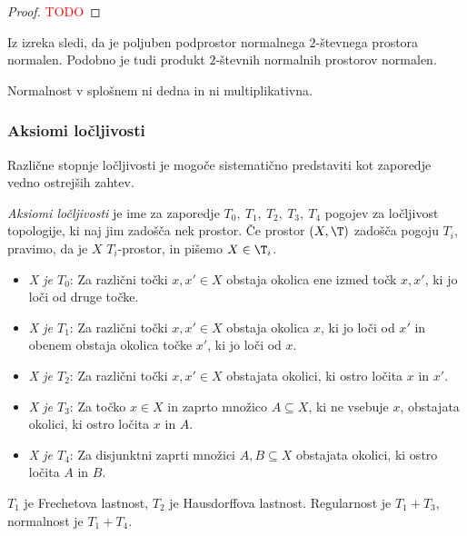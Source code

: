 \begin{proof}
    \textcolor{red}{TODO}
\end{proof}

\begin{opomba}
    Iz izreka sledi, da je poljuben podprostor normalnega $2$-števnega prostora normalen. Podobno je tudi produkt $2$-števnih normalnih prostorov normalen.
\end{opomba}

\begin{opomba}
    Normalnost v splošnem ni dedna in ni multiplikativna.
\end{opomba}

\subsubsection{Aksiomi ločljivosti}
Različne stopnje ločljivosti je mogoče sistematično predstaviti kot zaporedje vedno ostrejših zahtev.

\begin{definicija}
    \emph{Aksiomi ločljivosti} je ime za zaporedje $T_0, \ T_1, \  T_2,\ T_3,\ T_4$ pogojev za ločljivost topologije, ki naj jim zadošča nek prostor. Če prostor $(X, \T)$ zadošča pogoju $T_i$, pravimo, da je $X$ $T_i$-prostor, in pišemo $X \in \T_i$.
\end{definicija}


\begin{itemize}
    \item [] \emph{X je $T_0$}: Za različni točki $x, x' \in X$ obstaja okolica ene izmed točk $x, x'$, ki jo loči od druge točke.
    \item [] \emph{X je $T_1$}: Za različni točki $x, x' \in X$ obstaja okolica $x$, ki jo loči od $x'$ in obenem obstaja okolica točke $x'$, ki jo loči od $x$.
    \item [] \emph{X je $T_2$}: Za različni točki $x, x' \in X$ obstajata okolici, ki ostro ločita $x$ in $x'$.
    \item [] \emph{X je $T_3$}: Za točko $x \in X$ in zaprto množico $A \subseteq X$, ki ne vsebuje $x$, obstajata okolici, ki ostro ločita $x$ in $A$.
    \item [] \emph{X je $T_4$}: Za disjunktni zaprti množici $A, B \subseteq X$ obstajata okolici, ki ostro ločita $A$ in $B$.
\end{itemize}

\begin{opomba}
    $T_1$ je Frechetova lastnost, $T_2$ je Hausdorffova lastnost. Regularnost je $T_1 + T_3$, normalnost je $T_1 + T_4$.
\end{opomba}

